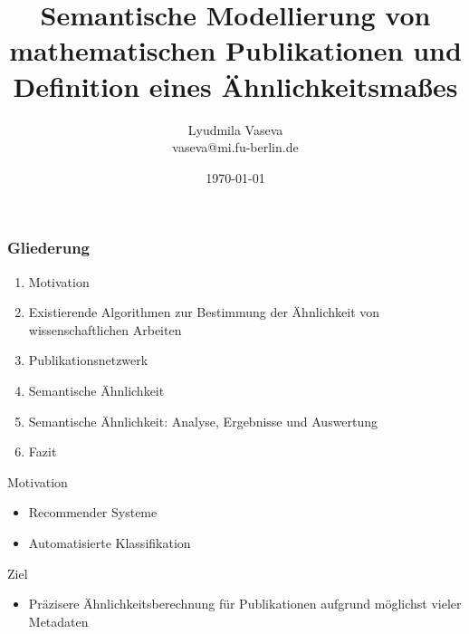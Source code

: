 \documentclass[12pt, xcolor=table]{beamer}
\begin{document}
\title{Semantische Modellierung von mathematischen Publikationen und Definition eines Ähnlichkeitsmaßes}
\author[Lyudmila Vaseva]{Lyudmila Vaseva\\{vaseva@mi.fu-berlin.de}}
\date{\today}

\begin{frame}
	\titlepage
\end{frame}


\begin{frame}
    \frametitle{Gliederung}
    \begin{enumerate}
        \item Motivation
        \item Existierende Algorithmen zur Bestimmung der Ähnlichkeit von wissenschaftlichen Arbeiten
        \item Publikationsnetzwerk
        \item Semantische Ähnlichkeit
        \item Semantische Ähnlichkeit: Analyse, Ergebnisse und Auswertung
        \item Fazit
    \end{enumerate}
\end{frame}


\begin{frame}
    \begin{block}{Motivation}
    \begin{itemize}
        \item Recommender Systeme
        \item Automatisierte Klassifikation
    \end{itemize}
    \end{block}

    \begin{block}{Ziel}
    \begin{itemize}
    \item Präzisere Ähnlichkeitsberechnung für Publikationen aufgrund möglichst vieler Metadaten
    \end{itemize}
    \end{block}
\end{frame}
\end{document}
